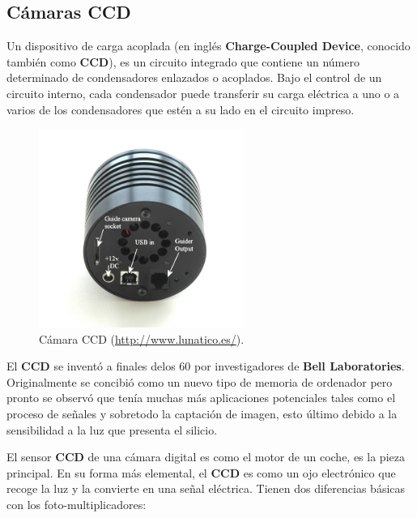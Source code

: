 \subsection{Cámaras CCD}

Un dispositivo de carga acoplada (en inglés \textbf{Charge-Coupled Device}, conocido también como \textbf{CCD}), es un circuito integrado que contiene un número determinado de condensadores enlazados o acoplados. Bajo el control de un circuito interno, cada condensador puede transferir su carga eléctrica a uno o a varios de los condensadores que estén a su lado en el circuito impreso.\cite{CCD}

\bigskip
\begin{figure}[!ht]
  \begin{center}
  \includegraphics[width=0.6\textwidth]{../images/ccd.jpg}
  \caption{Cámara CCD (\href{http://www.lunatico.es/}{http://www.lunatico.es/}).}
  \label{fig:diag_scrum}
  \end{center}
\end{figure}

\bigskip
El \textbf{CCD} se inventó a finales delos 60 por investigadores de \textbf{Bell Laboratories}. Originalmente se concibió como un nuevo tipo de memoria de ordenador pero pronto se observó que tenía muchas más aplicaciones potenciales tales como el proceso de señales y sobretodo la captación de imagen, esto último debido a la sensibilidad a la luz que presenta el silicio.

\bigskip
El sensor \textbf{CCD} de una cámara digital es como el motor de un coche, es la pieza principal. En su forma más elemental, el \textbf{CCD} es como un ojo electrónico que recoge la luz y la convierte en una señal eléctrica. Tienen dos diferencias básicas con los foto-multiplicadores:

